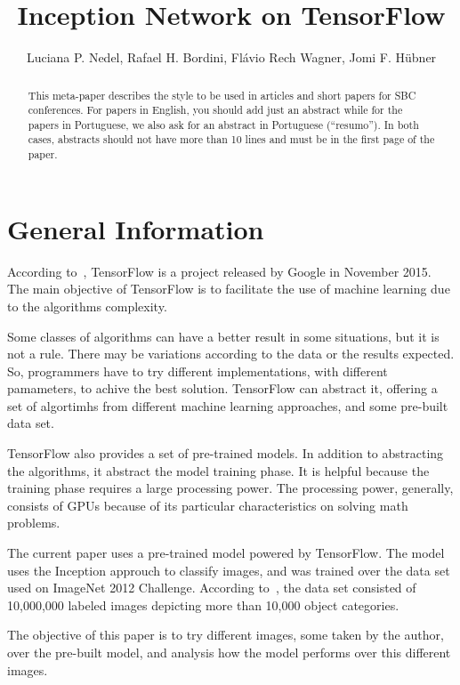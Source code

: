 \documentclass[12pt]{article}
\title{Inception Network on TensorFlow}
\author{Luciana P. Nedel\inst{1}, Rafael H. Bordini\inst{2}, Flávio Rech
  Wagner\inst{1}, Jomi F. Hübner\inst{3} }
\begin{document}
 

\maketitle

\begin{abstract}
  This meta-paper describes the style to be used in articles and short papers
  for SBC conferences. For papers in English, you should add just an abstract
  while for the papers in Portuguese, we also ask for an abstract in
  Portuguese (``resumo''). In both cases, abstracts should not have more than
  10 lines and must be in the first page of the paper.
\end{abstract}


\section{General Information}

According to~\cite{tensorflow2015-whitepaper}, TensorFlow is a project released by Google in November 2015. The main objective of TensorFlow is to facilitate the use of machine learning due to the algorithms complexity.

Some classes of algorithms can have a better result in some situations, but it is not a rule. There may be variations according to the data or the results expected. So, programmers have to try different implementations, with different pamameters, to achive the best solution. TensorFlow can abstract it, offering a set of algortimhs from different machine learning approaches, and some pre-built data set.

TensorFlow also provides a set of pre-trained models. In addition to abstracting the algorithms, it abstract the model training phase. It is helpful because the training phase requires a large processing power. The processing power, generally, consists of GPUs because of its particular characteristics on solving math problems.

The current paper uses a pre-trained model powered by TensorFlow. The model uses the Inception approuch to classify images, and was trained over the data set used on ImageNet 2012 Challenge. According to~\cite{imagenet}, the data set consisted of 10,000,000 labeled images depicting more than 10,000 object categories.

The objective of this paper is to try different images, some taken by the author, over the pre-built model, and analysis how the model performs over this different images.
\end{document}
